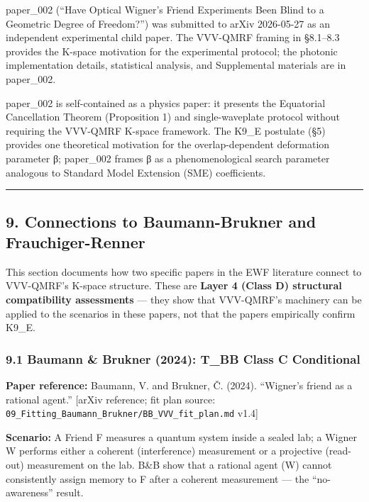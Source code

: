 \documentclass[
  11pt,
]{article}
\begin{document}
paper\_002 (``Have Optical Wigner's Friend Experiments Been Blind to a
Geometric Degree of Freedom?'') was submitted to arXiv 2026-05-27 as an
independent experimental child paper. The VVV-QMRF framing in §8.1--8.3
provides the K-space motivation for the experimental protocol; the
photonic implementation details, statistical analysis, and Supplemental
materials are in paper\_002.

paper\_002 is self-contained as a physics paper: it presents the
Equatorial Cancellation Theorem (Proposition 1) and single-waveplate
protocol without requiring the VVV-QMRF K-space framework. The K9\_E
postulate (§5) provides one theoretical motivation for the
overlap-dependent deformation parameter β; paper\_002 frames β as a
phenomenological search parameter analogous to Standard Model Extension
(SME) coefficients.

\begin{center}\rule{0.5\linewidth}{0.5pt}\end{center}

\subsection{9. Connections to Baumann-Brukner and
Frauchiger-Renner}\label{connections-to-baumann-brukner-and-frauchiger-renner}

This section documents how two specific papers in the EWF literature
connect to VVV-QMRF's K-space structure. These are \textbf{Layer 4
(Class D) structural compatibility assessments} --- they show that
VVV-QMRF's machinery can be applied to the scenarios in these papers,
not that the papers empirically confirm K9\_E.

\subsubsection{9.1 Baumann \& Brukner (2024): T\_BB Class C
Conditional}\label{baumann-brukner-2024-t_bb-class-c-conditional}

\textbf{Paper reference:} Baumann, V. and Brukner, Č. (2024). ``Wigner's
friend as a rational agent.'' {[}arXiv reference; fit plan source:
\texttt{09\_Fitting\_Baumann\_Brukner/BB\_VVV\_fit\_plan.md} v1.4{]}

\textbf{Scenario:} A Friend F measures a quantum system inside a sealed
lab; a Wigner W performs either a coherent (interference) measurement or
a projective (read-out) measurement on the lab. B\&B show that a
rational agent (W) cannot consistently assign memory to F after a
coherent measurement --- the ``no-awareness'' result.
\end{document}
